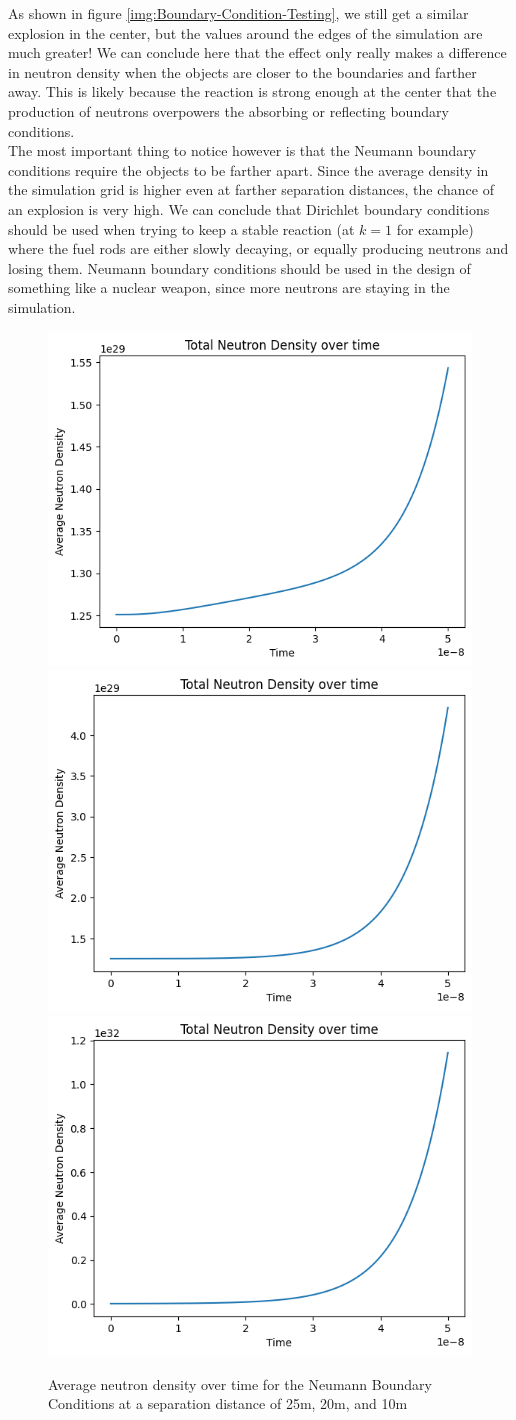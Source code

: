 \documentclass[letterpaper, 12pt]{article}
\begin{document}
         As shown in figure \ref{img:Boundary-Condition-Testing}, we still get a similar explosion in the center, but the values around the edges of the simulation are much greater! We can conclude here that the effect only really makes a difference in neutron density when the objects are closer to the boundaries and farther away. This is likely because the reaction is strong enough at the center that the production of neutrons overpowers the absorbing or reflecting boundary conditions. \\

         The most important thing to notice however is that the Neumann boundary conditions require the objects to be farther apart. Since the average density in the simulation grid is higher even at farther separation distances, the chance of an explosion is very high. We can conclude that Dirichlet boundary conditions should be used when trying to keep a stable reaction (at $k = 1$ for example) where the fuel rods are either slowly decaying, or equally producing neutrons and losing them. Neumann boundary conditions should be used in the design of something like a nuclear weapon, since more neutrons are staying in the simulation.

         \begin{figure}[b]
            \centering
            \includegraphics[width=0.32\linewidth]{Graphs/NeumannCubes_Density_Vs_Time_Far.png}
            \includegraphics[width=0.32\linewidth]{Graphs/NeumannCubes_Density_Vs_Time_Middle.png}
            \includegraphics[width=0.32\linewidth]{Graphs/NeumannCubes_Density_Vs_Time_Close.png}
            \caption{Average neutron density over time for the Neumann Boundary Conditions at a separation distance of 25m, 20m, and 10m}
            \label{img:Neumann_Cubes}
         \end{figure}
\end{document}
